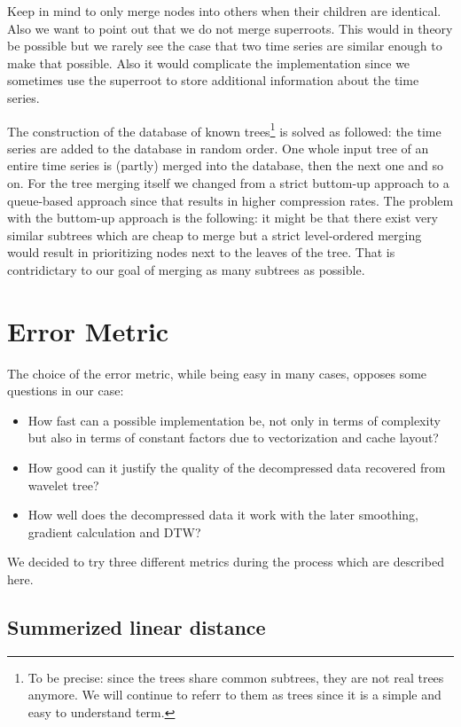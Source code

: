 Keep in mind to only merge nodes into others when their children are identical. Also we want to point out that we do not merge superroots. This would in theory be possible but we rarely see the case that two time series are similar enough to make that possible. Also it would complicate the implementation since we sometimes use the superroot to store additional information about the time series.

The construction of the database of known trees\footnote{To be precise: since the trees share common subtrees, they are not real trees anymore. We will continue to referr to them as trees since it is a simple and easy to understand term.} is solved as followed: the time series are added to the database in random order. One whole input tree of an entire time series is (partly) merged into the database, then the next one and so on. For the tree merging itself we changed from a strict buttom-up approach to a queue-based approach since that results in higher compression rates. The problem with the buttom-up approach is the following: it might be that there exist very similar subtrees which are cheap to merge but a strict level-ordered merging would result in prioritizing nodes next to the leaves of the tree. That is contridictary to our goal of merging as many subtrees as possible.



\section{Error Metric}
\label{sec:algorithm:error}

The choice of the error metric, while being easy in many cases, opposes some questions in our case:

\begin{itemize}
    \item How fast can a possible implementation be, not only in terms of complexity but also in terms of constant factors due to vectorization and cache layout?
    \item How good can it justify the quality of the decompressed data recovered from wavelet tree?
    \item How well does the decompressed data it work with the later smoothing, gradient calculation and DTW?
\end{itemize}

We decided to try three different metrics during the process which are described here.


\subsection{Summerized linear distance}
\label{ssec:algorithm:error:linear}

